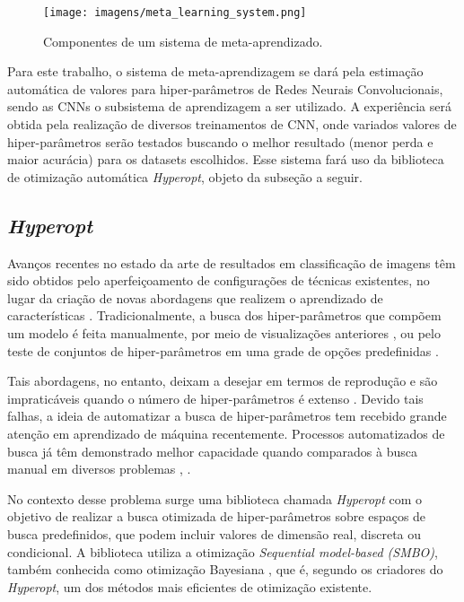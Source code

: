 \documentclass[
12pt,				%
openright,			%
oneside,			%
a4paper,			%
english,			%
french,				%
spanish,			%
brazil				%
]{abntex2}
\begin{document}
\begin{figure}[ht]
\centering
\caption{Componentes de um sistema de meta-aprendizado.}
\texttt{[image: imagens/meta\_learning\_system.png]}
\label{fig:meta_learning_system}
\end{figure}

Para este trabalho, o sistema de meta-aprendizagem se dará pela estimação automática de valores para hiper-parâmetros de Redes Neurais Convolucionais, sendo as CNNs o subsistema de aprendizagem a ser utilizado. A experiência será obtida pela realização de diversos treinamentos de CNN, onde variados valores de hiper-parâmetros serão testados buscando o melhor resultado (menor perda e maior acurácia) para os datasets escolhidos. Esse sistema fará uso da biblioteca de otimização automática \textit{Hyperopt}, objeto da subseção a seguir.

\subsection{\textit{Hyperopt}} \label{hyperopt}

Avanços recentes no estado da arte de resultados em classificação de imagens têm sido obtidos pelo aperfeiçoamento de configurações de técnicas existentes, no lugar da criação de novas abordagens que realizem o aprendizado de características \cite{bergstra2011algorithms}. Tradicionalmente, a busca dos hiper-parâmetros que compõem um modelo é feita manualmente, por meio de visualizações anteriores \cite{Hinton2012}, \cite{Hsu2003APG} ou pelo teste de conjuntos de hiper-parâmetros em uma grade de opções predefinidas \cite{Pedregosa2011}. 

Tais abordagens, no entanto, deixam a desejar em termos de reprodução e são impraticáveis quando o número de hiper-parâmetros é extenso \cite{ClaesenM15}. Devido tais falhas, a ideia de automatizar a busca de hiper-parâmetros tem recebido grande atenção em aprendizado de máquina recentemente. Processos automatizados de busca já têm demonstrado melhor capacidade quando comparados à busca manual em diversos problemas \cite{Bergstra2011}, \cite{Bergstra2012}.

No contexto desse problema surge uma biblioteca chamada \textit{Hyperopt} \cite{bergstra2013hyperopt} com o objetivo de realizar a busca otimizada de hiper-parâmetros sobre espaços de busca predefinidos, que podem incluir valores de dimensão real, discreta ou condicional. A biblioteca utiliza a otimização \textit{Sequential model-based (SMBO)}, também conhecida como otimização Bayesiana \cite{Pelikan1999}, que é, segundo os criadores do \textit{Hyperopt}, um dos métodos mais eficientes de otimização existente.
\end{document}

